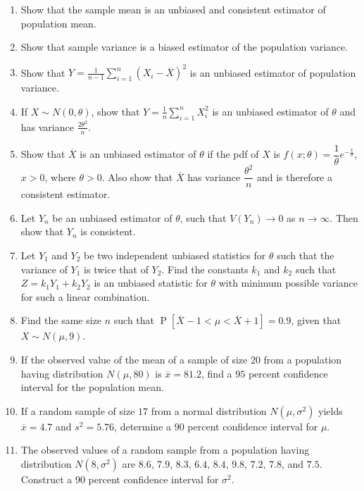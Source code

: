 \documentclass[svgnames]{amsart}
\DeclareMathOperator{\Prob}{P}
\begin{document}
\begin{enumerate}[leftmargin=*, itemsep=2mm]
\item Show that the sample mean is an unbiased and consistent estimator of population mean.

\item Show that sample variance is a biased estimator of the population variance.

\item Show that $Y = \frac{1}{n - 1} \sum_{i = 1}^n (X_i - \overline X)^2$ is an unbiased estimator of population variance.

\item If $X \sim N(0, \theta)$, show that $Y = \frac 1 n \sum_{i=1}^n X_i^2$ is an unbiased estimator of $\theta$ and has variance $\frac {2\theta^2} n$.

\item Show that $\overline X$ is an unbiased estimator of $\theta$ if the pdf of $X$ is $f(x; \theta) = \dfrac 1 \theta e^{-\frac x \theta}$, $x > 0$, where $\theta > 0$. Also show that $\overline X$ has variance $\dfrac {\theta^2} n$ and is therefore a consistent estimator.

\item Let $Y_n$ be an unbiased estimator of $\theta$, such that $V(Y_n) \to 0$ as $n \to \infty$. Then show that $Y_n$ is consistent.

\item Let $Y_1$ and $Y_2$ be two independent unbiased statistics for $\theta$ such that the variance of $Y_1$ is twice that of $Y_2$. Find the constants $k_1$ and $k_2$ such that $Z = k_1 Y_1 + k_2 Y_2$ is an unbiased statistic for $\theta$ with minimum possible variance for such a linear combination.

\item Find the same size $n$ such that $\Prob[\overline X - 1 < \mu < \overline X + 1] = 0.9$, given that $X \sim N(\mu, 9)$.

\item If the observed value of the mean of a sample of size $20$ from a population having distribution $N(\mu, 80)$ is $\overline x = 81.2$, find a $95$ percent confidence interval for the population mean.

\item If a random sample of size $17$ from a normal distribution $N(\mu, \sigma^2)$ yields $\overline x = 4.7$ and $s^2 = 5.76$, determine a $90$ percent confidence interval for $\mu$.

\item The observed values of a random sample from a population having distribution $N(8, \sigma^2)$ are $8.6$, $7.9$, $8.3$, $6.4$, $8.4$, $9.8$, $7.2$, $7.8$, and $7.5$. Construct a $90$ percent confidence interval for $\sigma^2$.


\end{enumerate}
\end{document}

